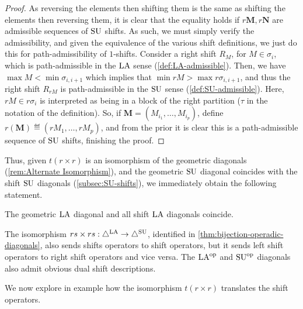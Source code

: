 \begin{proof}
As reversing the elements then shifting them is the same as shifting the elements then reversing them,
it is clear that the equality holds if $r\mathbf{M},r\mathbf{N}$ are admissible sequences of $\mathrm{SU}$ shifts.
As such, we must simply verify the admissibility, and given the equivalence of the various shift definitions, we just do this for path-admissibility of $1$-shifts.
Consider a right shift $R_{M}$, for $M \in \sigma_i$, which is path-admissible in the $\mathrm{LA}$ sense (\cref{def:LA-admissible}). 
Then, we have $\max M < \min \sigma_{i,i+1}$ which implies that $\min r M > \max r \sigma_{i,i+1}$, and thus the right shift $R_{rM}$ is path-admissible in the $\mathrm{SU}$ sense (\cref{def:SU-admissible}).
Here, $rM \in r\sigma_i$ is interpreted as being in a block of the right partition ($\tau$ in the notation of the definition).
So, if $\mathbf{M} = (M_{i_1},\dots,M_{i_p})$, define $r(\mathbf{M}) \eqdef (rM_{1},\dots,rM_{p})$, and from the prior it is clear this is a path-admissible sequence of $\mathrm{SU}$ shifts, finishing the proof.
\end{proof}
Thus, given $t(r\times r)$ is an isomorphism of the geometric diagonals (\cref{rem:Alternate Isomorphism}), and the geometric $\mathrm{SU}$ diagonal coincides with the shift $\mathrm{SU}$ diagonals (\cref{subsec:SU-shifts}), we immediately obtain the following statement.
\begin{proposition}
The geometric $\mathrm{LA}$ diagonal and all shift $\mathrm{LA}$ diagonals coincide.
\end{proposition}

\begin{remark}
The isomorphism $rs\times rs:\triangle^{\mathrm{LA}} \to \triangle^{\mathrm{SU}}$, identified in \cref{thm:bijection-operadic-diagonals}, also sends shifts operators to shift operators, but it sends left shift operators to right shift operators and vice versa.
The $\mathrm{LA}^{\mathrm{op}}$ and $\mathrm{SU}^{\mathrm{op}}$ diagonals also admit obvious dual shift descriptions.
\end{remark}

We now explore in example how the isomorphism $t(r\times r)$ translates the shift operators.

